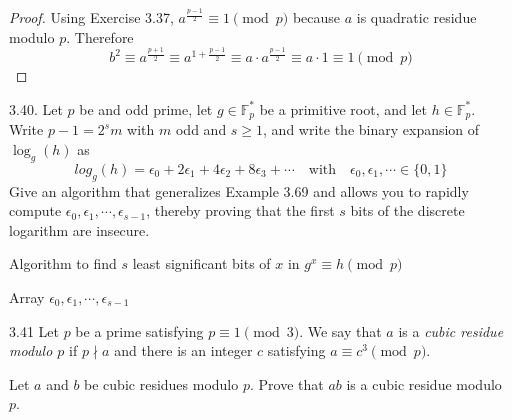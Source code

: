 		 \begin{proof}
			Using Exercise 3.37, $a^{\frac{p-1}{2}} \equiv 1 \pmod p$ because $a$ is quadratic residue modulo $p$. Therefore 
			\[b^2 \equiv a^{\frac{p+1}{2}} \equiv a^{1+\frac{p-1}{2}} \equiv a \cdot a^{\frac{p-1}{2}} \equiv a \cdot 1 \equiv 1 \pmod p\]
		 \end{proof}


3.40. Let $p$ be and odd prime, let $g \in \mathbb{F}^{*}_p$ be a primitive root, and let $h \in \mathbb{F}^{*}_p$. Write $p - 1 = 2^sm$ with $m$ odd and $s \geq 1$, and write the binary expansion of $\log_g(h)$ as $$log_g(h) = \epsilon_0 + 2\epsilon_1 + 4\epsilon_2 + 8\epsilon_3 + \cdots \quad \text{with} \quad \epsilon_0, \epsilon_1, \cdots \in \{0, 1\}$$
	Give an algorithm that generalizes Example 3.69 and allows you to rapidly compute $\epsilon_0, \epsilon_1, \cdots, \epsilon_{s-1}$, thereby proving that the first $s$ bits of the discrete logarithm are insecure.
	
	\begin{algorithm}
		\caption{Algorithm to find $s$ least significant bits of $x$ in $g^x \equiv h \pmod p$}
		\begin{algorithmic}
			
			Array $\epsilon_0, \epsilon_1, \cdots, \epsilon_{s-1}$\;
		\end{algorithmic}
	\end{algorithm}

3.41 Let $p$ be a prime satisfying $p \equiv 1 \pmod 3$. We say that $a$ is a \textit{cubic residue modulo $p$} if $p \nmid a$ and there is an integer $c$ satisfying $a \equiv c^3 \pmod p$.
	
Let $a$ and $b$ be cubic residues modulo $p$. Prove that $ab$ is a cubic residue modulo $p$.

